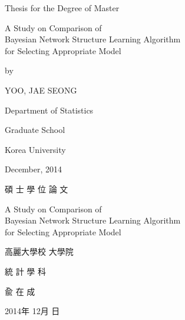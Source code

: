 \documentclass[12pt,a4paper,oneside]{book}
\theoremstyle{plain}
\theoremstyle{definition}
\theoremstyle{remark}
\theoremstyle{definition}
\numberwithin{equation}{chapter}
\begin{document}





 \linespread{1.0}
 \thispagestyle{empty}
 \begin{center}
 {\Large Thesis for the Degree of Master}
 \end{center}
 \vspace{20mm}
 \begin{center}
 \LARGE A Study on Comparison of\\ Bayesian Network Structure Learning Algorithm\\ for Selecting Appropriate Model
 \end{center}
 \vspace{20mm}
  \begin{center}
 {\Large by}
 \end{center}
 \begin{center}
 {\Large YOO, JAE SEONG}
 \end{center}
 \vspace{40mm}
 \begin{center}
 {\Large Department of Statistics}
 \end{center}
 \begin{center}
 {\Large Graduate School}
 \end{center}
 \begin{center}
 {\Large Korea University}
 \end{center}
  \vspace{5mm}
 \begin{center}
 {\Large December, 2014}
 \end{center}
 \linespread{1.6}





\newpage{}
 \linespread{1.0}
 \thispagestyle{empty}
 \vspace{30mm}
 \begin{center}
 {\Large 碩 士 學 位 論 文}
 \end{center}
 \vspace{27mm}
 \begin{center}
 \LARGE A Study on Comparison of\\ Bayesian Network Structure Learning Algorithm\\ for Selecting Appropriate Model
 \end{center}
 \vspace{80mm}
 \begin{center}
 {\Large 高麗大學校 大學院}
 \end{center}
 \begin{center}
 {\Large 統 計 學 科}
 \end{center}
 \begin{center}
 {\Large 兪 \quad\quad 在 \quad\quad 成}
 \end{center}
  \vspace{7mm}
 \begin{center}
 {\Large 2014年 \quad 12月 \quad 日}
 \end{center}
 \linespread{1.6}
\end{document}
